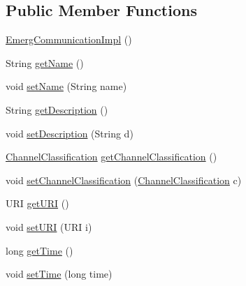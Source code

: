 \subsection*{Public Member Functions}
\begin{DoxyCompactItemize}
\item 
\hyperlink{classgov_1_1fnal_1_1ppd_1_1dd_1_1emergency_1_1EmergCommunicationImpl_a9c0a60ee343b47b0d4ac2e0d7038d5c9}{Emerg\-Communication\-Impl} ()
\item 
String \hyperlink{classgov_1_1fnal_1_1ppd_1_1dd_1_1emergency_1_1EmergCommunicationImpl_a777c8533c18e551ffc31e3004c2b129d}{get\-Name} ()
\item 
void \hyperlink{classgov_1_1fnal_1_1ppd_1_1dd_1_1emergency_1_1EmergCommunicationImpl_ac3b27088fbf8a1641390f94a9bceae05}{set\-Name} (String name)
\item 
String \hyperlink{classgov_1_1fnal_1_1ppd_1_1dd_1_1emergency_1_1EmergCommunicationImpl_abb47282cc4f97a7f5b8a2f95ef98801b}{get\-Description} ()
\item 
void \hyperlink{classgov_1_1fnal_1_1ppd_1_1dd_1_1emergency_1_1EmergCommunicationImpl_a68bef53238492c65abac631c7d830201}{set\-Description} (String d)
\item 
\hyperlink{classgov_1_1fnal_1_1ppd_1_1dd_1_1changer_1_1ChannelClassification}{Channel\-Classification} \hyperlink{classgov_1_1fnal_1_1ppd_1_1dd_1_1emergency_1_1EmergCommunicationImpl_a1d603af23e42a20faa68eaf2de08cbcd}{get\-Channel\-Classification} ()
\item 
void \hyperlink{classgov_1_1fnal_1_1ppd_1_1dd_1_1emergency_1_1EmergCommunicationImpl_a4af13843cde9c0635c9c9159382f56af}{set\-Channel\-Classification} (\hyperlink{classgov_1_1fnal_1_1ppd_1_1dd_1_1changer_1_1ChannelClassification}{Channel\-Classification} c)
\item 
U\-R\-I \hyperlink{classgov_1_1fnal_1_1ppd_1_1dd_1_1emergency_1_1EmergCommunicationImpl_ab68ea958a435d5ae82a8ab8ed1de147f}{get\-U\-R\-I} ()
\item 
void \hyperlink{classgov_1_1fnal_1_1ppd_1_1dd_1_1emergency_1_1EmergCommunicationImpl_a1c1908434df69dea4854e5b5f44fff68}{set\-U\-R\-I} (U\-R\-I i)
\item 
long \hyperlink{classgov_1_1fnal_1_1ppd_1_1dd_1_1emergency_1_1EmergCommunicationImpl_a479c9d6bc4063377c83d165b6f5132b6}{get\-Time} ()
\item 
void \hyperlink{classgov_1_1fnal_1_1ppd_1_1dd_1_1emergency_1_1EmergCommunicationImpl_adeaeaa2f1d16e60ac141358bdb55695e}{set\-Time} (long time)
\item 

\end{DoxyCompactItemize}
